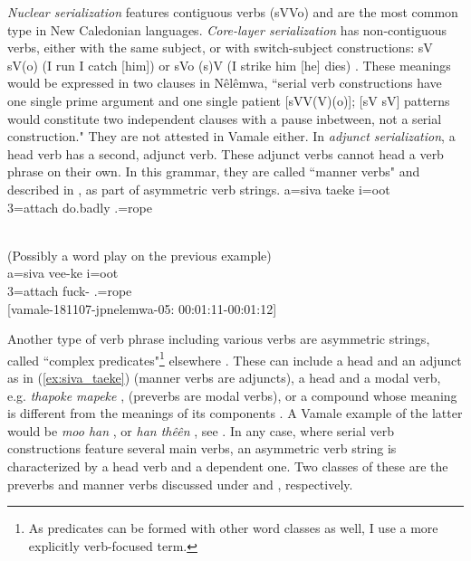 \emph{Nuclear serialization} features contiguous verbs (sVVo) and are the most common type in New Caledonian languages. 
\emph{Core-layer serialization} has non\hyp contiguous verbs, either with the same subject, or with switch-subject constructions: sV sV(o) (I run I catch [him]) or sVo (s)V (I strike him [he] dies) \parencite[4]{bril_complex_2004c}. These meanings would be expressed in two clauses in Nêlêmwa, ``serial verb constructions have one single prime argument and one single patient [sVV(V)(o)]; [sV sV] patterns would constitute two independent clauses with a pause inbetween, not a serial construction." \parencite[168]{bril_complex_2004} They are not attested in Vamale either. In \emph{adjunct serialization}, a head verb has a second, adjunct verb. These adjunct verbs cannot head a verb phrase on their own. In this grammar, they are called ``manner verbs" and described in , as part of asymmetric verb strings. 
\ea \label{ex:siva_taeke}
\gll a=siva taeke i=oot\\ 
 3=attach do.badly .=rope\\ 
\glt {}\\
\z


\ea 
(Possibly a word play on the previous example)\\
\gll a=siva vee-ke i=oot\\ 
 3=attach fuck- .=rope\\ 
\glt {} {[vamale-181107-jpnelemwa-05: 00:01:11-00:01:12]}
\z

Another type of verb phrase including various verbs are asymmetric strings, called ``complex predicates"\footnote{As predicates can be formed with other word classes as well, I use a more explicitly verb-focused term.} elsewhere \parencite[168]{bril_complex_2004}. These can include a head and an adjunct as in (\ref{ex:siva_taeke}) (manner verbs are adjuncts), a head and a modal verb, e.g. \textit{thapoke mapeke} ,  (preverbs are modal verbs), or a compound whose meaning is different from the meanings of its components \parencite[168]{bril_complex_2004}. A Vamale example of the latter would be \textit{moo han}  , or \textit{han thêên}  , see . In any case, where serial verb constructions feature several main verbs, an asymmetric verb string is characterized by a head verb and a dependent one. Two classes of these are the preverbs and manner verbs discussed under  and , respectively.

